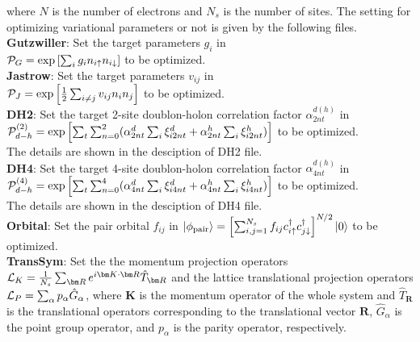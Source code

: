 \begin{description}
\begin{equation}
\end{equation}
where $N$ is the number of electrons and $N_s$ is the number of sites.
The setting for optimizing variational parameters or not is given by the following files.
~\\{\bf Gutzwiller}: Set the target parameters $g_i$ in\\
 ${\cal P}_G=\exp\left[ \sum_i g_i n_{i\uparrow} n_{i\downarrow} \right]$ to be optimized.
~\\{\bf Jastrow}: Set the target parameters $v_{ij}$ in\\
 ${\cal P}_J=\exp\left[\frac{1}{2} \sum_{i\neq j} v_{ij} n_i n_j\right]$ to be optimized.
~\\{\bf DH2}:  Set the target 2-site doublon-holon correlation factor $\alpha_{2nt}^{d(h)}$ in \\
${\cal P}_{d-h}^{(2)}= \exp \left[ \sum_t \sum_{n=0}^2 (\alpha_{2nt}^d \sum_{i}\xi_{i2nt}^d+\alpha_{2nt}^h \sum_{i}\xi_{i2nt}^h)\right]$ to be optimized. \\
The details are shown in the desciption of DH2 file.
~\\{\bf DH4}:  Set the target 4-site doublon-holon correlation factor $\alpha_{4nt}^{d(h)}$ in \\
${\cal P}_{d-h}^{(4)}= \exp \left[ \sum_t \sum_{n=0}^4 (\alpha_{4nt}^d \sum_{i}\xi_{i4nt}^d+\alpha_{4nt}^h \sum_{i}\xi_{i4nt}^h)\right]$ to be optimized.\\
The details are shown in the desciption of DH4 file.
~\\{\bf Orbital}: Set the pair orbital $f_{ij}$ in $|\phi_{\rm pair} \rangle = \left[\sum_{i, j=1}^{N_s} f_{ij}c_{i\uparrow}^{\dag}c_{j\downarrow}^{\dag} \right]^{N/2}|0 \rangle$ to be optimized.
~\\{\bf TransSym}: Set the the momentum projection operators ${\cal L}_K=\frac{1}{N_s}\sum_{{\bm R}}e^{i {\bm K} \cdot{\bm R} } \hat{T}_{\bm R}$ and the lattice translational projection operators ${\cal L}_P=\sum_{\alpha}p_{\alpha} \hat{G}_{\alpha}$, where ${\bm K}$ is the momentum operator of the whole system and $\hat{T}_{\bm R}$ is the translational operators corresponding to the translational vector ${\bm R}$, $\hat{G}_{\alpha}$ is the point group operator, and $p_\alpha$ is the parity operator, respectively.


\end{description}
